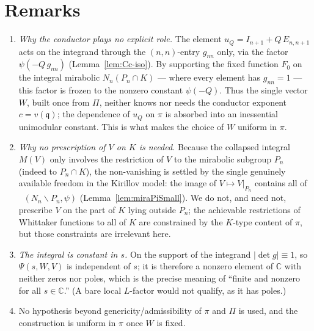 \documentclass[12pt]{article}
\newcommand{\qq}{\mathfrak{q}}
\DeclareMathOperator{\Cc}{C_c^\infty}
\begin{document}
\section*{Remarks}

\begin{enumerate}
\item \emph{Why the conductor plays no explicit role.} The element
$u_Q=I_{n+1}+Q\,E_{n,n+1}$ acts on the integrand through the $(n,n)$-entry $g_{nn}$
only, via the factor $\psi(-Q\,g_{nn})$ (Lemma~\ref{lem:Cc-iso}). By supporting the
fixed function $F_0$ on the integral mirabolic $N_n(P_n\cap K)$ --- where every
element has $g_{nn}=1$ --- this factor is frozen to the nonzero constant $\psi(-Q)$.
Thus the single vector $W$, built once from $\Pi$, neither knows nor needs the
conductor exponent $c=v(\qq)$; the dependence of $u_Q$ on $\pi$ is absorbed into an
inessential unimodular constant. This is what makes the choice of $W$ uniform in
$\pi$.

\item \emph{Why no prescription of $V$ on $K$ is needed.} Because the collapsed
integral $M(V)$ only involves the restriction of $V$ to the mirabolic subgroup
$P_n$ (indeed to $P_n\cap K$), the non-vanishing is settled by the single genuinely
available freedom in the Kirillov model: the image of $V\mapsto V|_{P_n}$ contains
all of $\Cc(N_n\backslash P_n,\psi)$ (Lemma~\ref{lem:miraPiSmall}). We do not, and
need not, prescribe $V$ on the part of $K$ lying outside $P_n$; the achievable
restrictions of Whittaker functions to all of $K$ are constrained by the $K$-type
content of $\pi$, but those constraints are irrelevant here.

\item \emph{The integral is constant in $s$.} On the support of the integrand
$|\det g|\equiv1$, so $\Psi(s,W,V)$ is independent of $s$; it is therefore a nonzero
element of $\mathbb C$ with neither zeros nor poles, which is the precise meaning of
``finite and nonzero for all $s\in\mathbb C$.'' (A bare local $L$-factor would not
qualify, as it has poles.)

\item No hypothesis beyond genericity/admissibility of $\pi$ and $\Pi$ is used, and
the construction is uniform in $\pi$ once $W$ is fixed.
\end{enumerate}
\end{document}
